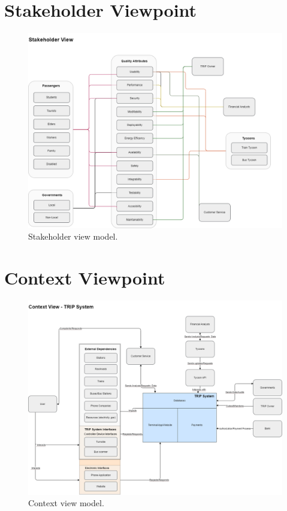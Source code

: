 \section{Stakeholder Viewpoint}
\begin{figure}[H]
    \centering
    \includegraphics[width=\textwidth]{drawings/views_draft3/stakeholder_view.png}
    \caption{Stakeholder view model.}
    \label{fig:stakeholder_view_model}
\end{figure}

\section{Context Viewpoint}

\begin{figure}[H]
    \centering
    \includegraphics[width=\textwidth]{drawings/views_draft3/context_view.png}
    \caption{Context view model.}
    \label{fig:context_view_model}
\end{figure}

